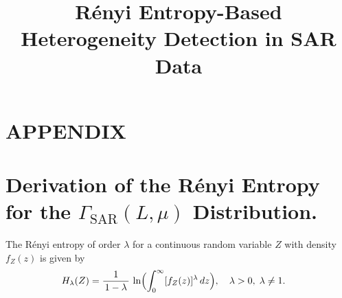 \documentclass[11pt,]{article}
\title{Rényi Entropy-Based Heterogeneity Detection in SAR Data  }
\author{\Large \vspace{0.05in} \newline\normalsize\emph{}  }
\date{}
\newcommand*{\authorfont}{\fontfamily{phv}\selectfont}
\begin{document}
	
%    


{%
\setlength{\parindent}{0pt}
\thispagestyle{plain}
{\fontsize{18}{20}\selectfont\raggedright 
\maketitle  %

}

{
   \vskip 13.5pt\relax \normalsize\fontsize{11}{12} 
\textbf{\authorfont } \hskip 15pt \emph{\small }   

}

}






\vskip -8.5pt



\noindent  

\newcommand{\bias}{\operatorname{Bias}}
\newcommand{\widebar}[1]{\overline{#1}}

\appendix

\section{APPENDIX}\label{appendix}

\section{\texorpdfstring{Derivation of the Rényi Entropy for the
\(\Gamma_{\text{SAR}}(L, \mu)\)
Distribution.}{Derivation of the Rényi Entropy for the \textbackslash Gamma\_\{\textbackslash text\{SAR\}\}(L, \textbackslash mu) Distribution.}}\label{derivation-of-the-ruxe9nyi-entropy-for-the-gamma_textsarl-mu-distribution.}

The Rényi entropy of order \(\lambda\) for a continuous random variable
\(Z\) with density \(f_Z(z)\) is given by \begin{align}
H_\lambda(Z) 
&= \frac{1}{\,1 - \lambda\,} \,\ln \Bigl( \int_{0}^{\infty} [f_Z(z)]^\lambda \, dz \Bigr),
\quad \lambda > 0, \;\lambda \neq 1.
\label{eq:RenyiDefinition}
\end{align}
\end{document}
